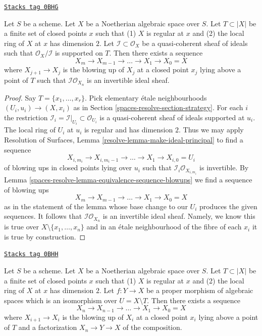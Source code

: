 \begin{lemma}
\label{spaces-resolve-lemma-make-ideal-principal}
\href{https://stacks.math.columbia.edu/tag/0BHG}{\texttt{Stacks tag 0BHG}}

Let $S$ be a scheme. Let $X$ be a Noetherian algebraic space over $S$.
Let $T \subset |X|$ be a finite set of closed points $x$ such that
(1) $X$ is regular at $x$ and (2) the local ring of $X$ at $x$ has
dimension $2$. Let $\mathcal{I} \subset \mathcal{O}_X$ be a quasi-coherent
sheaf of ideals such that $\mathcal{O}_X/\mathcal{I}$ is supported on $T$.
Then there exists a sequence
$$
X_m \to X_{m - 1} \to \ldots \to X_1 \to X_0 = X
$$
where $X_{j + 1} \to X_j$ is the blowing up of $X_j$ at a closed
point $x_j$ lying above a point of $T$ such that
$\mathcal{I}\mathcal{O}_{X_n}$ is an invertible ideal sheaf.
\end{lemma}

\begin{proof}
Say $T = \{x_1, \ldots, x_r\}$. Pick elementary \'etale neighbourhoods
$(U_i, u_i) \to (X, x_i)$ as in Section \ref{spaces-resolve-section-strategy}.
For each $i$ the restriction
$\mathcal{I}_i = \mathcal{I}|_{U_i} \subset \mathcal{O}_{U_i}$
is a quasi-coherent sheaf of ideals supported at $u_i$.
The local ring of $U_i$ at $u_i$ is regular and has dimension $2$.
Thus we may apply
Resolution of Surfaces, Lemma \ref{resolve-lemma-make-ideal-principal}
to find a sequence
$$
X_{i, m_i} \to X_{i, m_i - 1} \to \ldots \to X_1 \to X_{i, 0} = U_i
$$
of blowing ups in closed points lying over $u_i$ such that
$\mathcal{I}_i \mathcal{O}_{X_{i, m_i}}$ is invertible.
By Lemma \ref{spaces-resolve-lemma-equivalence-sequence-blowups}
we find a sequence of blowing ups
$$
X_m \to X_{m - 1} \to \ldots \to X_1 \to X_0 = X
$$
as in the statement of the lemma whose base change to our $U_i$
produces the given sequences. It follows that
$\mathcal{I}\mathcal{O}_{X_n}$ is an invertible ideal sheaf.
Namely, we know this is true over $X \setminus \{x_1, \ldots, x_n\}$
and in an \'etale neighbourhood of the fibre of each $x_i$
it is true by construction.
\end{proof}

\begin{lemma}
\label{spaces-resolve-lemma-dominate-by-blowing-up-in-points}
\href{https://stacks.math.columbia.edu/tag/0BHH}{\texttt{Stacks tag 0BHH}}

Let $S$ be a scheme. Let $X$ be a Noetherian algebraic space over $S$.
Let $T \subset |X|$ be a finite set of closed points $x$ such that
(1) $X$ is regular at $x$ and (2) the local ring of $X$ at $x$ has
dimension $2$. Let $f : Y \to X$ be a proper morphism of
algebraic spaces which is an isomorphism over $U = X \setminus T$.
Then there exists a sequence
$$
X_n \to X_{n - 1} \to \ldots \to X_1 \to X_0 = X
$$
where $X_{i + 1} \to X_i$ is the blowing up of $X_i$ at a closed
point $x_i$ lying above a point of $T$ and a factorization $X_n \to Y \to X$
of the composition.
\end{lemma}

